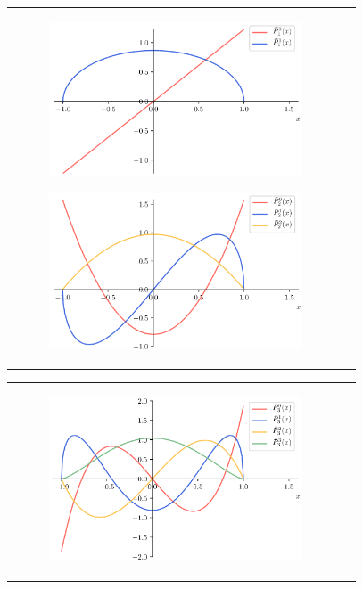 \documentclass[../main/main]{subfiles}
\begin{document}
\begin{figure}[tb]
\begin{tabular}{cc}
\hspace{-24pt}
 \begin{minipage}{0.50\hsize}\small
    \begin{figure}[H]
      \centering
      \includegraphics[width=75mm]{../fig/legendre/assoc_legendre1.png}
    \end{figure}
 \end{minipage}

 \begin{minipage}{0.50\hsize}
    \begin{figure}[H]
      \centering
      \includegraphics[width=75mm]{../fig/legendre/assoc_legendre2.png}
    \end{figure}
 \end{minipage}
\end{tabular}

\begin{tabular}{cc}
\hspace{-24pt}
 \begin{minipage}{0.50\hsize}
    \begin{figure}[H]
      \centering
      \includegraphics[width=75mm]{../fig/legendre/assoc_legendre3.png}
    \end{figure}
 \end{minipage}


\end{tabular}
\end{figure}
\end{document}
